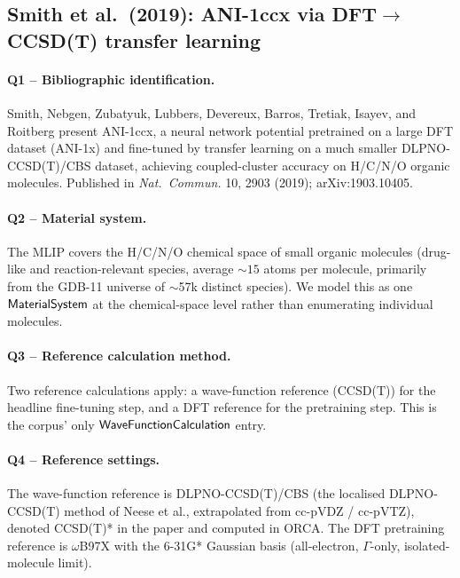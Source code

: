 \subsection{Smith et al.\ (2019): ANI-1ccx via DFT$\to$CCSD(T) transfer learning}
\label{sec:appendix-example-smith2019ccx}

\paragraph{Q1 -- Bibliographic identification.}
Smith, Nebgen, Zubatyuk, Lubbers, Devereux, Barros, Tretiak, Isayev,
and Roitberg present ANI-1ccx, a neural network potential pretrained
on a large DFT dataset (ANI-1x) and fine-tuned by transfer learning
on a much smaller DLPNO-CCSD(T)/CBS dataset, achieving coupled-cluster
accuracy on H/C/N/O organic molecules. Published in
\emph{Nat.\ Commun.} 10, 2903 (2019); arXiv:1903.10405.


\paragraph{Q2 -- Material system.}
The MLIP covers the H/C/N/O chemical space of small organic molecules
(drug-like and reaction-relevant species, average ${\sim}15$ atoms per
molecule, primarily from the GDB-11 universe of $\sim$57k distinct
species). We model this as one $\mathsf{MaterialSystem}$ at the
chemical-space level rather than enumerating individual molecules.


\paragraph{Q3 -- Reference calculation method.}
Two reference calculations apply: a wave-function reference (CCSD(T))
for the headline fine-tuning step, and a DFT reference for the
pretraining step. This is the corpus' only
$\mathsf{WaveFunctionCalculation}$ entry.


\paragraph{Q4 -- Reference settings.}
The wave-function reference is DLPNO-CCSD(T)/CBS (the localised
DLPNO-CCSD(T) method of Neese et al., extrapolated from cc-pVDZ /
cc-pVTZ), denoted CCSD(T)* in the paper and computed in ORCA. The
DFT pretraining reference is $\omega$B97X with the 6-31G* Gaussian
basis (all-electron, $\Gamma$-only, isolated-molecule limit).


